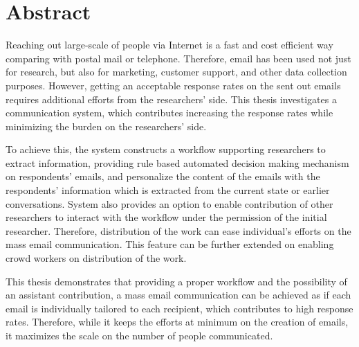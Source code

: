 
{}
{}	

\chapter*{Abstract}

Reaching out large-scale of people via Internet is a fast and cost efficient way comparing with postal mail or telephone. Therefore, email has been used not just for research, but also for marketing, customer support, and other data collection purposes. However, getting an acceptable response rates on the sent out emails requires additional efforts from the researchers' side. This thesis investigates a communication system, which contributes increasing the response rates while minimizing the burden on the researchers' side. 
\vspace{1cm}

To achieve this, the system constructs a workflow supporting researchers to extract information, providing rule based automated decision making mechanism on respondents' emails, and personalize the content of the emails with the respondents' information which is extracted from the current state or earlier conversations. System also provides an option to enable contribution of other researchers to interact with the workflow under the permission of the initial researcher. Therefore, distribution of the work can ease individual's efforts on the mass email communication. This feature can be further extended on enabling crowd workers on distribution of the work.
\vspace{1cm}

This thesis demonstrates that providing a proper workflow and the possibility of an assistant contribution, a mass email communication can be achieved as if each email is individually tailored to each recipient, which contributes to high response rates. Therefore, while it keeps the efforts at minimum on the creation of emails, it maximizes the scale on the number of people communicated.
